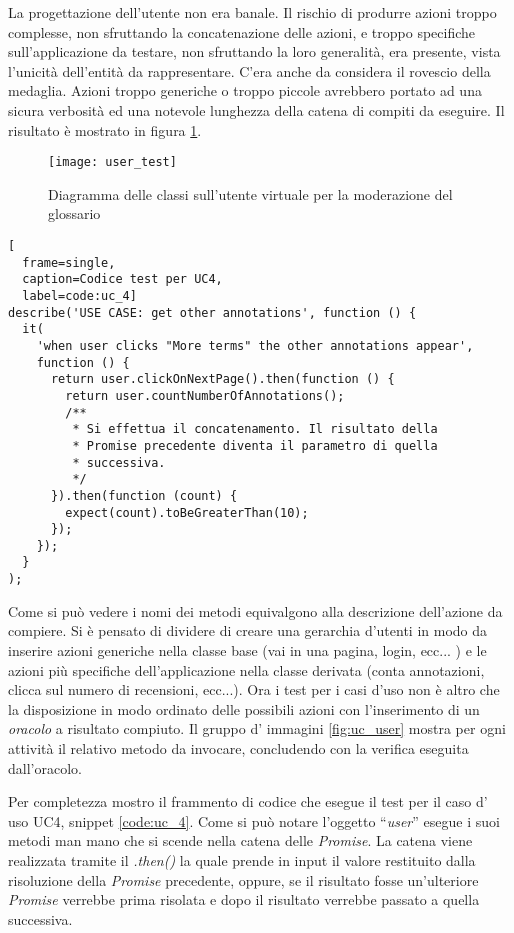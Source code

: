La progettazione dell'utente non era banale. Il rischio di produrre azioni
troppo complesse, non sfruttando la concatenazione delle azioni, e troppo
specifiche sull'applicazione da testare, non sfruttando la loro generalità,
era presente, vista l'unicità dell'entità da rappresentare. C'era anche da
considera il rovescio della medaglia. Azioni troppo generiche o troppo piccole
avrebbero portato ad una sicura verbosità ed una notevole lunghezza della catena
di compiti da eseguire. Il risultato è mostrato in figura \ref{fig:user_test}.

\begin{figure}[H]
\begin{center}
\texttt{[image: user\_test]}
\caption{
Diagramma delle classi sull'utente virtuale per la moderazione del glossario
}
\label{fig:user_test}
\end{center}
\end{figure}

\begin{center}
\begin{lstlisting}[
  frame=single,
  caption=Codice test per UC4,
  label=code:uc_4]
describe('USE CASE: get other annotations', function () {
  it(
    'when user clicks "More terms" the other annotations appear',
    function () {
      return user.clickOnNextPage().then(function () {
        return user.countNumberOfAnnotations();
        /**
         * Si effettua il concatenamento. Il risultato della
         * Promise precedente diventa il parametro di quella
         * successiva.
         */
      }).then(function (count) {
        expect(count).toBeGreaterThan(10);
      });
    });
  }
);
\end{lstlisting}
\end{center}

Come si può vedere i nomi dei metodi equivalgono alla descrizione dell'azione
da compiere. Si è pensato di dividere di creare una gerarchia d'utenti in modo
da inserire azioni generiche nella classe base (vai in una pagina, login, ecc...
) e le azioni più specifiche dell'applicazione nella classe derivata (conta
annotazioni, clicca sul numero di recensioni, ecc...). Ora i test per i casi
d'uso non è altro che la disposizione in modo ordinato delle possibili azioni
con l'inserimento di un \textit{oracolo} a risultato compiuto. Il gruppo d'
immagini \ref{fig:uc_user} mostra per ogni attività il relativo metodo da
invocare, concludendo con la verifica eseguita dall'oracolo.

Per completezza mostro il frammento di codice che esegue il test per il caso d'
uso UC4, snippet \ref{code:uc_4}. Come si può notare l'oggetto ``\textit{user}''
esegue i suoi metodi man mano che si scende nella catena delle \textit{Promise}.
La catena viene realizzata tramite il \textit{.then()} la quale prende in input
il valore restituito dalla risoluzione della \textit{Promise} precedente,
oppure, se il risultato fosse un'ulteriore \textit{Promise} verrebbe prima
risolata e dopo il risultato verrebbe passato a quella successiva.

